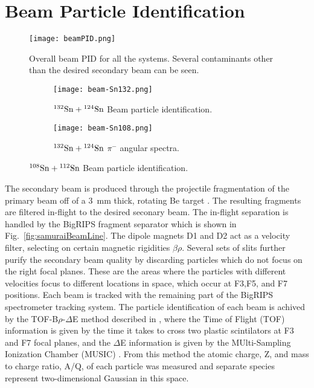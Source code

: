 \section{Beam Particle Identification}


\begin{figure}[!htb]
\centering
\texttt{[image: beamPID.png]}
\caption{Overall beam PID for all the systems. Several contaminants other than the desired secondary beam can be seen.}
\label{fig:beampid}
\end{figure}


\begin{figure}[!htb]

     \centering
     \begin{subfigure}[b]{0.49\textwidth}
         \centering
         \texttt{[image: beam-Sn132.png]}
         \caption{${}^{132}\mathrm{Sn} + {}^{124}\mathrm{Sn}$ Beam particle identification.}
         \label{fig:beampid132}
     \end{subfigure}
     \hfill
     \begin{subfigure}[b]{0.49\textwidth}
         \centering
         \texttt{[image: beam-Sn108.png]}
         \caption{${}^{132}\mathrm{Sn} + {}^{124}\mathrm{Sn}$ $\pi^-$ angular spectra.}
         \label{fig:beampid108}
     \end{subfigure}
        \caption{${}^{108}\mathrm{Sn} + {}^{112}\mathrm{Sn}$ Beam particle identification. }
        \label{fig:beampidTwo}

\end{figure}


The secondary beam is produced through the projectile fragmentation of the primary beam off of a \SI{3}{\milli\metre} thick, rotating Be target \cite{inflightsep}. The resulting fragments are filtered in-flight to the desired seconary beam. The in-flight separation is handled by the BigRIPS fragment separator which is shown in Fig.~\ref{fig:samuraiBeamLine}. The dipole magnets D1 and D2 act as a velocity filter, selecting on certain magnetic rigidities $\beta\rho$. Several sets of slits further purify the secondary beam quality by discarding particles which do not focus on the right focal planes. These are the areas where the particles with different velocities focus to different locations in space, which occur at F3,F5, and F7 positions.  Each beam is tracked with the remaining part of the BigRIPS spectrometer tracking system. The particle identification of each beam is achived by the TOF-B$\rho$-$\Delta$E method described in \cite{bigrips}, where the Time of Flight (TOF) information is given by the time it takes to cross two plastic scintilators at F3 and F7 focal planes, and the $\Delta$E information is given by the MUlti-Sampling Ionization Chamber (MUSIC) \cite{music}. From this method the atomic charge, Z, and mass to charge ratio, A/Q, of each particle was measured and separate species represent two-dimensional Gaussian in this space. 

